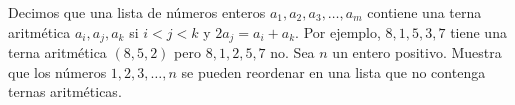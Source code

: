 Decimos que una lista de números enteros $a_1,a_2,a_3,\dots ,a_m$ contiene una terna aritmética $a_i,a_j,a_k$ si $i\lt j\lt k$ y $2a_j=a_i+a_k$. Por ejemplo, $8,1,5,3,7$ tiene una terna aritmética $(8,5,2)$ pero $8,1,2,5,7$ no. Sea $n$ un entero positivo. Muestra que los números $1,2,3,\dots ,n$ se pueden reordenar en una lista que no contenga ternas aritméticas.